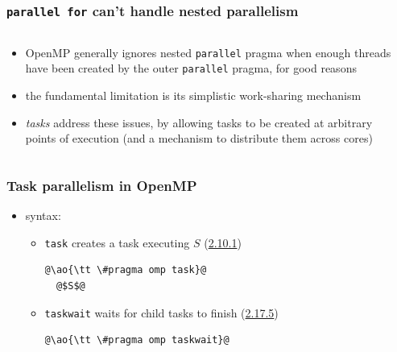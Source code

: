 \documentclass[12pt,dvipdfmx]{beamer}
\newcommand{\sectionomptask}{{\href{https://www.openmp.org/spec-html/5.0/openmpsu46.html\#x70-2000002.10.1}{2.10.1}}}
\newcommand{\sectionomptaskwait}{{\href{https://www.openmp.org/spec-html/5.0/openmpsu93.html\#x124-4690002.17.5}{2.17.5}}}
\newcommand{\ao}[1]{{\color{blue}#1}}
\begin{document}
\begin{frame}
\frametitle{\texttt{parallel for} can't handle nested parallelism}
\begin{columns}
  \begin{column}{0.6\textwidth}
\begin{itemize}
\item<1-> OpenMP generally ignores nested
  \texttt{parallel} pragma when enough
  threads have been created by the outer
  \texttt{parallel} pragma, for good reasons

\item<2-> the fundamental limitation is its
  simplistic work-sharing mechanism

\item<3-> \ao{\it tasks} address these issues, by allowing tasks
  to be created at arbitrary points of execution
  (and a mechanism to distribute them across cores)
\end{itemize}
  \end{column}

\begin{column}{0.4\textwidth}
\def\svgwidth{\textwidth}
{\scriptsize }
\end{column}
\end{columns}
\end{frame}



\begin{frame}[fragile]
\frametitle{Task parallelism in OpenMP}
\begin{itemize}
\item syntax:
  \begin{itemize}
  \item {\tt task} creates a task executing $S$ (\sectionomptask)
\begin{lstlisting}
@\ao{\tt \#pragma omp task}@
  @$S$@
\end{lstlisting}
\item {\tt taskwait} waits for child tasks to finish (\sectionomptaskwait)
\begin{lstlisting}
@\ao{\tt \#pragma omp taskwait}@
\end{lstlisting}
  \end{itemize}
\end{itemize}
\end{frame}
\end{document}
